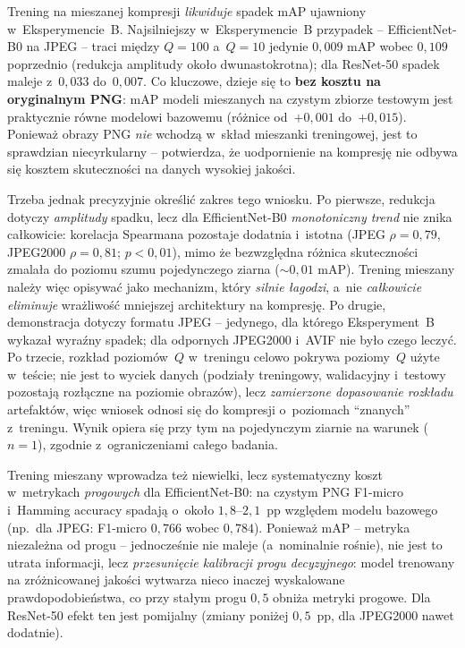 \documentclass[12pt,a4paper]{article}
\begin{document}
Trening na mieszanej kompresji \emph{likwiduje} spadek mAP ujawniony w~Eksperymencie~B. Najsilniejszy w~Eksperymencie~B przypadek -- EfficientNet-B0 na JPEG -- traci między $Q=100$ a~$Q=10$ jedynie $0{,}009$ mAP wobec $0{,}109$ poprzednio (redukcja amplitudy około dwunastokrotna); dla ResNet-50 spadek maleje z~$0{,}033$ do~$0{,}007$. Co kluczowe, dzieje się to \textbf{bez kosztu na oryginalnym PNG}: mAP modeli mieszanych na czystym zbiorze testowym jest praktycznie równe modelowi bazowemu (różnice od~$+0{,}001$ do~$+0{,}015$). Ponieważ obrazy PNG \emph{nie} wchodzą w~skład mieszanki treningowej, jest to sprawdzian niecyrkularny -- potwierdza, że uodpornienie na kompresję nie odbywa się kosztem skuteczności na danych wysokiej jakości.

Trzeba jednak precyzyjnie określić zakres tego wniosku. Po pierwsze, redukcja dotyczy \emph{amplitudy} spadku, lecz dla EfficientNet-B0 \emph{monotoniczny trend} nie znika całkowicie: korelacja Spearmana pozostaje dodatnia i~istotna (JPEG $\rho=0{,}79$, JPEG2000 $\rho=0{,}81$; $p<0{,}01$), mimo że bezwzględna różnica skuteczności zmalała do poziomu szumu pojedynczego ziarna ($\sim$$0{,}01$ mAP). Trening mieszany należy więc opisywać jako mechanizm, który \emph{silnie łagodzi}, a~nie \emph{całkowicie eliminuje} wrażliwość mniejszej architektury na kompresję. Po drugie, demonstracja dotyczy formatu JPEG -- jedynego, dla którego Eksperyment~B wykazał wyraźny spadek; dla odpornych JPEG2000 i~AVIF nie było czego leczyć. Po trzecie, rozkład poziomów~$Q$ w~treningu celowo pokrywa poziomy~$Q$ użyte w~teście; nie jest to wyciek danych (podziały treningowy, walidacyjny i~testowy pozostają rozłączne na poziomie obrazów), lecz \emph{zamierzone dopasowanie rozkładu} artefaktów, więc wniosek odnosi się do kompresji o~poziomach \enquote{znanych} z~treningu. Wynik opiera się przy tym na pojedynczym ziarnie na warunek ($n=1$), zgodnie z~ograniczeniami całego badania.

Trening mieszany wprowadza też niewielki, lecz systematyczny koszt w~metrykach \emph{progowych} dla EfficientNet-B0: na czystym PNG F1-micro i~Hamming accuracy spadają o~około $1{,}8$--$2{,}1$~pp względem modelu bazowego (np.~dla JPEG: F1-micro $0{,}766$ wobec $0{,}784$). Ponieważ mAP -- metryka niezależna od progu -- jednocześnie nie maleje (a~nominalnie rośnie), nie jest to utrata informacji, lecz \emph{przesunięcie kalibracji progu decyzyjnego}: model trenowany na zróżnicowanej jakości wytwarza nieco inaczej wyskalowane prawdopodobieństwa, co przy stałym progu $0{,}5$ obniża metryki progowe. Dla ResNet-50 efekt ten jest pomijalny (zmiany poniżej $0{,}5$~pp, dla JPEG2000 nawet dodatnie).
\end{document}
